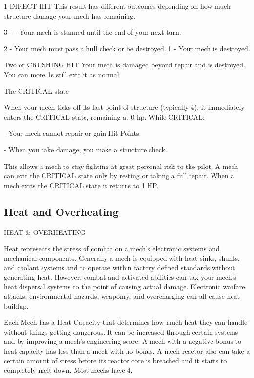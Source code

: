  1               DIRECT HIT               This result has different outcomes depending on how much
                                          structure damage your mech has remaining.

                                          3+ - Your mech is stunned until the end of your next turn.

                                          2 - Your mech must pass a hull check or be destroyed.
                                          1 - Your mech is destroyed.

 Two or          CRUSHING HIT             Your mech is damaged beyond repair and is destroyed. You can
 more 1s                                  still exit it as normal.

                                              The CRITICAL state


When your mech ticks off its last point of structure (typically 4), it immediately enters the
CRITICAL state, remaining at 0 hp. While CRITICAL:

             -    Your mech cannot repair or gain Hit Points.

             -    When you take damage, you make a structure check.

This allows a mech to stay fighting at great personal risk to the pilot. A mech can exit the
CRITICAL state only by resting or taking a full repair. When a mech exits the CRITICAL state it
returns to 1 HP.

\subsection{Heat and Overheating}

  HEAT \& OVERHEATING

Heat represents the stress of combat on a mech’s electronic systems and mechanical
components. Generally a mech is equipped with heat sinks, shunts, and coolant systems and to
operate within factory defined standards without generating heat. However, combat and
activated abilities can tax your mech’s heat dispersal systems to the point of causing actual
damage. Electronic warfare attacks, environmental hazards, weaponry, and overcharging can all
cause heat buildup.


Each Mech has a Heat Capacity that determines how much heat they can handle without things
getting dangerous. It can be increased through certain systems and by improving a mech’s
engineering score. A mech with a negative bonus to heat capacity has less than a mech with no
bonus. A mech reactor also can take a certain amount of stress before its reactor core is
breached and it starts to completely melt down. Most mechs have 4.


